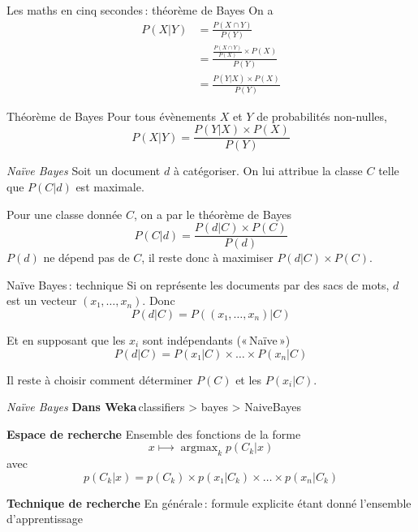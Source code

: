 \documentclass[hyperref={unicode}, xcolor={svgnames}, french]{beamer}
\DeclareMathOperator*\argmax{argmax}
\begin{document}
\begin{frame}{Les maths en cinq secondes : théorème de Bayes}
    On a
    \begin{align}
        P(X|Y)
            &= \frac{P(X∩Y)}{P(Y)}\\
            &= \frac{\frac{P(X∩Y)}{P(X)}×P(X)}{P(Y)}\\
            &= \frac{P(Y|X)×P(X)}{P(Y)}
    \end{align}
    \begin{block}{Théorème de Bayes}
        Pour tous évènements $X$ et $Y$ de probabilités non-nulles,
        \begin{equation}
            P(X|Y)=\frac{P(Y|X)×P(X)}{P(Y)}
        \end{equation}
    \end{block}
\end{frame}

\begin{frame}{\emph{Naïve Bayes}}
    Soit un document $d$ à catégoriser.
    On lui attribue la classe $C$ telle que $P(C|d)$ est maximale.

    Pour une classe donnée $C$, on a par le théorème de Bayes
    \begin{equation}
        P(C|d) = \frac{P(d|C)×P(C)}{P(d)}
    \end{equation}
    $P(d)$ ne dépend pas de $C$, il reste donc à maximiser $P(d|C)×P(C)$.
\end{frame}

\begin{frame}{Naïve Bayes : technique}
    Si on représente les documents par des sacs de mots, $d$ est un vecteur $(x₁, …, x_n)$.
    Donc
    \begin{equation}
        P(d|C) = P((x₁, …, x_n)|C)
    \end{equation}

    Et en supposant que les $x_i$ sont indépendants (« Naïve »)
    \begin{equation}
        P(d|C) = P(x₁|C)×…×P(x_n|C)
    \end{equation}

    Il reste à choisir comment déterminer $P(C)$ et les $P(x_i|C)$.
\end{frame}

\begin{frame}{\emph{Naïve Bayes}}
    \textbf{Dans Weka} classifiers > bayes > NaiveBayes

    \textbf{Espace de recherche} Ensemble des fonctions de la forme
    \begin{equation}
        x ⟼ \argmax_k p(C_k | x)
    \end{equation}
    avec
    \begin{equation}
        p(C_k | x) = p(C_k) × p(x₁ | C_k) × … × p(x_n | C_k)
    \end{equation}

    \textbf{Technique de recherche} En générale : formule explicite étant donné l'ensemble d'apprentissage
\end{frame}
\end{document}
